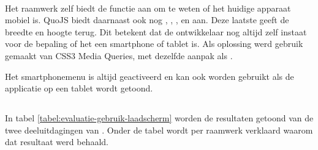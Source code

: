 \paragraph{\lungo}
Het raamwerk zelf biedt de functie  aan om te weten of het huidige apparaat mobiel is.
QuoJS biedt daarnaast ook nog , , ,  en  aan.
Deze laatste geeft de breedte en hoogte terug.
Dit betekent dat de ontwikkelaar nog altijd zelf instaat voor de bepaling of het een smartphone of tablet is.
Als oplossing werd gebruik gemaakt van CSS3 Media Queries, met dezelfde aanpak als \jqm{}.

Het smartphonemenu is altijd geactiveerd en kan ook worden gebruikt als de applicatie op een tablet wordt getoond.


\subsection{} 
\label{sec:evaluatie-gebruik-laadscherm}

In tabel \ref{tabel:evaluatie-gebruik-laadscherm} worden de resultaten getoond van de twee deeluitdagingen van .
Onder de tabel wordt per raamwerk verklaard waarom dat resultaat werd behaald.

\begin{table}[H]
\centering
{}
\caption{Gebruik van  voor \st{}~(\sta), \kendo{}~(\kendoa), \jqm{}~(\jqma) en \lungo{}~(\lungoa).}
\label{tabel:evaluatie-gebruik-laadscherm}
\end{table}


